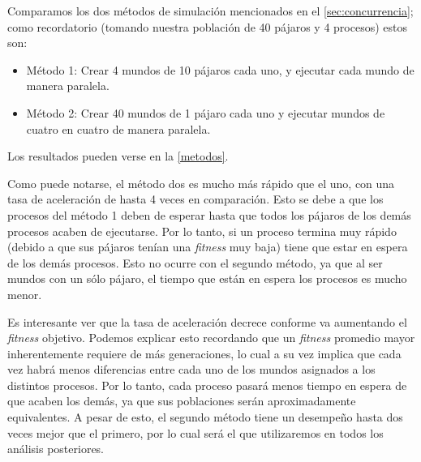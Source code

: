 \documentclass[twocolumn,spanish]{revtex4-1}
\begin{document}
Comparamos los dos métodos de simulación mencionados en el \cref{sec:concurrencia}; como recordatorio (tomando nuestra población de 40 pájaros y 4 procesos) estos son:
\begin{itemize}
    \item Método 1: Crear 4 mundos de 10 pájaros cada uno, y ejecutar cada mundo de manera paralela.
    \item Método 2: Crear 40 mundos de 1 pájaro cada uno y ejecutar mundos de cuatro en cuatro de manera paralela.
\end{itemize}
Los resultados pueden verse en la \cref{metodos}. 

Como puede notarse, el método dos es mucho más rápido que el uno, con una tasa de aceleración de hasta 4 veces en comparación. Esto se debe a que los procesos del método 1 deben de esperar hasta que todos los pájaros de los demás procesos acaben de ejecutarse. Por lo tanto, si un proceso termina muy rápido (debido a que sus pájaros tenían una \textit{fitness} muy baja) tiene que estar en espera de los demás procesos. Esto no ocurre con el segundo método, ya que al ser mundos con un sólo pájaro, el tiempo que están en espera los procesos es mucho menor.

Es interesante ver que la tasa de aceleración decrece conforme va aumentando el \textit{fitness} objetivo. Podemos explicar esto recordando que un \textit{fitness} promedio mayor inherentemente requiere de más generaciones, lo cual a su vez implica que cada vez habrá menos diferencias entre cada uno de los mundos asignados a los distintos procesos. Por lo tanto, cada proceso pasará menos tiempo en espera de que acaben los demás, ya que sus poblaciones serán aproximadamente equivalentes. A pesar de esto, el segundo método tiene un desempeño hasta dos veces mejor que el primero, por lo cual será el que utilizaremos en todos los análisis posteriores.
\end{document}
